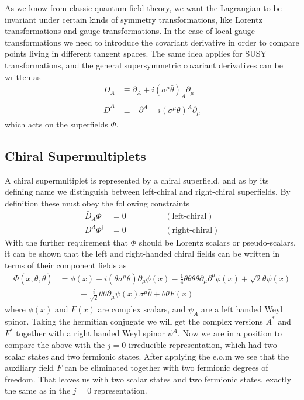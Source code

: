 As we know from classic quantum field theory, we want the Lagrangian to be invariant under certain kinds of symmetry transformations, like Lorentz transformations and gauge transformations. In the case of local gauge transformations we need to introduce the covariant derivative in order to compare points living in different tangent spaces. The same idea applies for SUSY transformations, and the general supersymmetric covariant derivatives can be written as
\begin{align}
    D_{A}&\equiv\partial_{A}+i(\sigma^{\mu}\bar{\theta})_{A}\partial_{\mu}
    \\
    \bar{D}^{\dot{A}}&\equiv-\partial^{\dot{A}}-i(\sigma^{\mu}\theta)^{\dot{A}}\partial_{\mu}
\end{align}
which acts on the superfields $\Phi$.
\subsection{Chiral Supermultiplets}
A chiral supermultiplet is represented by a chiral superfield, and as by its defining name we distinguish between left-chiral and right-chiral superfields. By definition these must obey the following constraints
\begin{align}
    \bar{D}_{\dot{A}}\Phi&=0\hspace{2cm}(\text{left-chiral})
    \\
    {D}^{A}\Phi^{\dagger}&=0\hspace{2cm}(\text{right-chiral})
\end{align}
With the further requirement that $\Phi$ should be Lorentz scalars or pseudo-scalars, it can be shown that the left and right-handed chiral fields can be written in terms of their component fields as
\begin{align}
    \Phi(x,\theta,\bar{\theta})&=\phi(x)+i(\theta\sigma^{\mu}\bar{\theta})\partial_{\mu}\phi(x)-\frac{1}{4}\theta\theta\bar{\theta}\bar{\theta}\partial_{\mu}{\partial^{\mu}}\phi(x)+\sqrt{2}\theta\psi(x)
    \\
    &\hspace{1cm}-\frac{i}{\sqrt{2}}\theta\theta\partial_{\mu}\psi(x)\sigma^{\mu}\bar{\theta}+\theta\theta F(x)
\end{align}
where $\phi(x)$ and $F(x)$ are complex scalars, and $\psi_{A}$ are a left handed Weyl spinor. Taking the hermitian conjugate we will get the complex versions $A^{*}$ and $F^{*}$ together with a right handed Weyl spinor $\psi^{\dot{A}}$. Now we are in a position to compare the above with the $j=0$ irreducible representation, which had two scalar states and two fermionic states. After applying the e.o.m we see that the auxiliary field $F$ can be eliminated together with two fermionic degrees of freedom. That leaves us with two scalar states and two fermionic states, exactly the same as in the $j=0$ representation.

